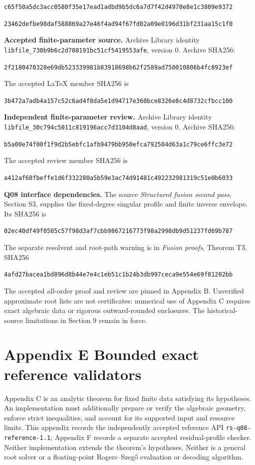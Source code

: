 \documentclass[
  11pt,
]{article}
\begin{document}
\nolinkurl{c65f50a5dc3acc0580f35e17ead1adbd9b5dc6a7d7f42d4970e8e1c3809e9372}

\nolinkurl{23462defbe98daf588869a27e46f4ad94f67fd02a09e0196d31bf231aa15c1f0}

\textbf{Accepted finite-parameter source.} Archive Library identity
\nolinkurl{libfile_730b9b6c2d708191bc51cf5419553afe}, version 0.
Archive SHA256:

\nolinkurl{2f2180470328e69db523339981b83918698b62f2589ad750010806b4fc8923ef}

The accepted LaTeX member SHA256 is

\nolinkurl{3b472a7adb4a157c52c6ad4f8da5e1d94717e360bce8326e8c4d8732cfbcc100}

\textbf{Independent finite-parameter review.} Archive Library identity
\nolinkurl{libfile_30c794c5011c819196acc7d3104d8aad}, version 0.
Archive SHA256:

\nolinkurl{b5a00e74f00f1f9d2b5ebfc1afb9479bb950efca792504d63a1c79ce6ffc3e72}

The accepted review member SHA256 is

\nolinkurl{a412af68fbeffe1d6f332280a5b59e3ac74d91481c492232981319c51e0b6033}

\textbf{Q08 interface dependencies.} The source \emph{Structured fusion
second pass}, Section S3, supplies the fixed-degree singular profile
and finite inverse envelope. Its SHA256 is

\nolinkurl{02ec40df49f0585c57f98d3af7cbb9867216773f98a2998db9d51237fd69b787}

The separate resolvent and root-path warning is in \emph{Fusion proofs},
Theorem T3, SHA256

\nolinkurl{4afd27bacea1bd896d8b44e7e4c1eb51c1b24b3db997ceca9e554e69f81202bb}

The accepted all-order proof and review are pinned in Appendix B.
Unverified approximate root lists are not certificates: numerical use
of Appendix C requires exact algebraic data or rigorous outward-rounded
enclosures. The historical-source limitations in Section 9 remain in
force.

\clearpage
\section{Appendix E Bounded exact reference validators}
\label{appendix-e-validators}

Appendix C is an analytic theorem for fixed finite data satisfying its
hypotheses. An implementation must additionally prepare or verify the
algebraic geometry, enforce strict inequalities, and account for its
supported input and resource limits. This appendix records the independently
accepted reference API \texttt{rs-q08-reference-1.1}; Appendix F records a
separate accepted residual-profile checker. Neither implementation extends
the theorem's hypotheses. Neither is a general root solver or a
floating-point Rogers--Szegő evaluation or decoding algorithm.
\end{document}
